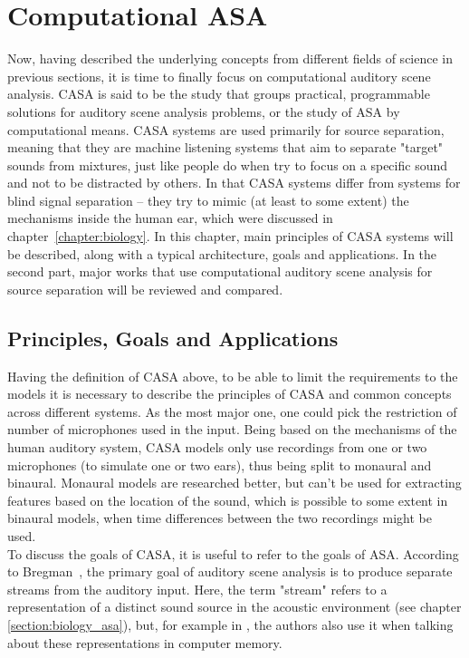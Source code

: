 \section{Computational ASA}\label{chapter:casa}

Now, having described the underlying concepts from different fields of science in previous sections, it is time to finally focus on computational auditory scene analysis. CASA is said to be the study that groups practical, programmable solutions for auditory scene analysis problems, or the study of ASA by computational means. CASA systems are used primarily for source se\-pa\-ra\-tion, meaning that they are machine listening systems that aim to separate "target" sounds from mixtures, just like people do when try to focus on a specific sound and not to be distracted by others. In that CASA systems differ from systems for blind signal separation – they try to mimic (at least to some extent) the mechanisms inside the human ear, which were discussed in chapter~\ref{chapter:biology}. In this chapter, main principles of CASA systems will be described, along with a typical architecture, goals and applications. In the second part, major works that use computational auditory scene analysis for source separation will be reviewed and compared.

\subsection{Principles, Goals and Applications}

Having the definition of CASA above, to be able to limit the requirements to the models it is necessary to describe the principles of CASA and common concepts across different systems. As the most major one, one could pick the restriction of number of microphones used in the input. Being based on the mechanisms of the human auditory system, CASA models only use recordings from one or two microphones (to simulate one or two ears), thus being split to monaural and binaural. Monaural models are researched better, but can't be used for extracting features based on the location of the sound, which is possible to some extent in binaural models, when time differences between the two recordings might be used.\\

To discuss the goals of CASA, it is useful to refer to the goals of ASA. According to Bregman~\cite{Bregman1990}, the primary goal of auditory scene analysis is to produce separate streams from the auditory input. Here, the term "stream" refers to a representation of a distinct sound source in the acoustic environment (see chapter \ref{section:biology_asa}), but, for example in \cite{Wang2006}, the authors also use it when talking about these representations in computer memory.\\

